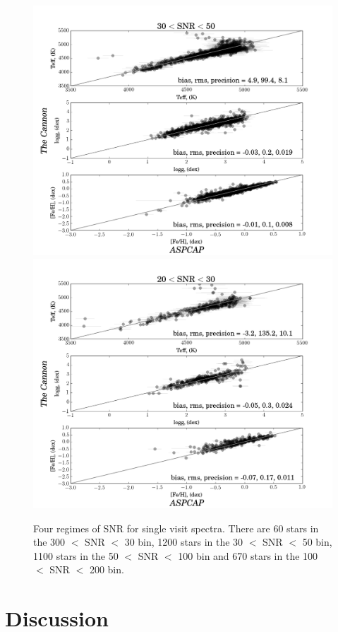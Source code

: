 \documentclass[12pt, preprint]{aastex}
\begin{document}
\begin{figure}[!h]
\includegraphics[scale=0.25]{./plots/SNR30to50.png}
\includegraphics[scale=0.25]{./plots/SNR20to30.png}
    \caption{Four regimes of SNR for single visit spectra. There are 60 stars in the 300 $<$  SNR $<$ 30 bin, 1200 stars in the 30 $<$ SNR $<$ 50 bin, 1100 stars in the 50 $<$ SNR $<$ 100 bin and 670 stars in the 100 $<$  SNR $<$ 200 bin.}
\label{fig:SNR}
\end{figure}

\section{Discussion}
\end{document}
